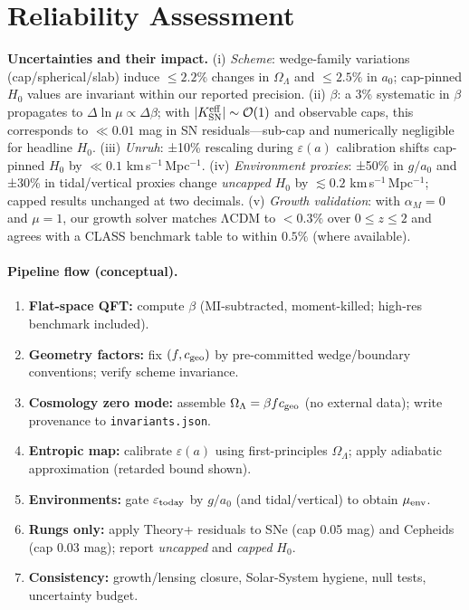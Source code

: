 \documentclass[aps,prd,preprint,onecolumn,longbibliography,nofootinbib]{revtex4-2}
\theoremstyle{plain}
\theoremstyle{remark}
\newcommand{\OmL}{\Omega_\Lambda}
\newcommand{\Hzero}{H_0}
\newcommand{\alM}{\alpha_{\!M}}
\newcommand{\be}{\beta}
\newcommand{\eps}{\varepsilon}
\begin{document}
\section{Reliability Assessment}\label{sec:reliability}
\textbf{Uncertainties and their impact.}  
(i) \emph{Scheme}: wedge-family variations (cap/spherical/slab) induce $\le 2.2\%$ changes in $\OmL$ and $\le 2.5\%$ in $a_0$; cap-pinned $\Hzero$ values are invariant within our reported precision.  
(ii) \emph{$\be$}: a 3\% systematic in $\be$ propagates to $\Delta \ln\mu \propto \Delta \be$; with $|K^{\rm eff}_{\rm SN}|\sim \mathcal O(1)$ and observable caps, this corresponds to $\ll 0.01$ mag in SN residuals—sub-cap and numerically negligible for headline $\Hzero$.  
(iii) \emph{Unruh}: ±10\% rescaling during $\eps(a)$ calibration shifts cap-pinned $\Hzero$ by $\ll 0.1$ km\,s$^{-1}$\,Mpc$^{-1}$.  
(iv) \emph{Environment proxies}: ±50\% in $g/a_0$ and ±30\% in tidal/vertical proxies change \emph{uncapped} $\Hzero$ by $\lesssim 0.2$ km\,s$^{-1}$\,Mpc$^{-1}$; capped results unchanged at two decimals.  
(v) \emph{Growth validation}: with $\alM=0$ and $\mu=1$, our growth solver matches ΛCDM to $<0.3\%$ over $0\!\le\!z\!\le\!2$ and agrees with a CLASS benchmark table to within $0.5\%$ (where available).  

\paragraph*{Pipeline flow (conceptual).}
\begin{enumerate}[label=\Roman*.]
\item \textbf{Flat-space QFT:} compute $\be$ (MI-subtracted, moment-killed; high-res benchmark included).
\item \textbf{Geometry factors:} fix $(f, c_{\rm geo})$ by pre-committed wedge/boundary conventions; verify scheme invariance.
\item \textbf{Cosmology zero mode:} assemble $\OmL=\be f c_{\rm geo}$ (no external data); write provenance to \texttt{invariants.json}.
\item \textbf{Entropic map:} calibrate $\eps(a)$ using first-principles $\OmL$; apply adiabatic approximation (retarded bound shown).
\item \textbf{Environments:} gate $\eps_{\rm today}$ by $g/a_0$ (and tidal/vertical) to obtain $\mu_{\rm env}$.
\item \textbf{Rungs only:} apply Theory+ residuals to SNe (cap 0.05 mag) and Cepheids (cap 0.03 mag); report \emph{uncapped} and \emph{capped} $\Hzero$.
\item \textbf{Consistency:} growth/lensing closure, Solar-System hygiene, null tests, uncertainty budget.
\end{enumerate}
\end{document}
